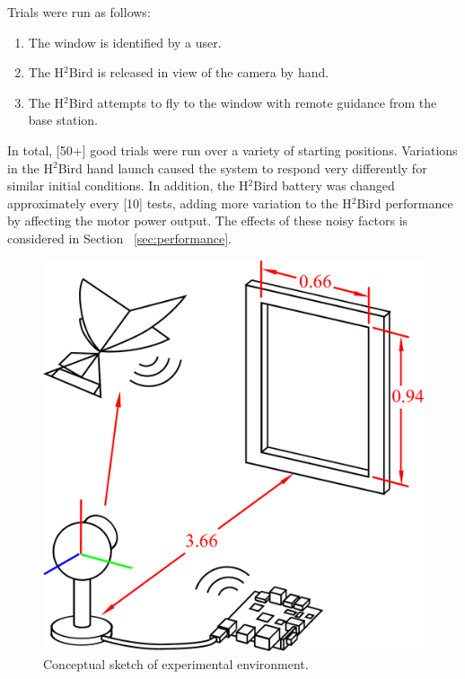 \documentclass{aamas2013}
\begin{document}
Trials were run as follows:
\begin{enumerate}
\item The window is identified by a user. 
\item The H$^2$Bird is released in view of the camera by hand.
\item The H$^2$Bird attempts to fly to the window with remote guidance from
the base station.
\end{enumerate}

In total, [50+] good trials were run over a variety of starting positions. 
Variations in the H$^2$Bird hand launch caused the system to respond very 
differently for similar initial conditions. In addition, the H$^2$Bird 
battery was changed approximately every [10] tests, adding more variation to
the H$^2$Bird performance by affecting the motor power output. The effects of 
these noisy factors is considered in Section ~\ref{sec:performance}.

\begin{figure}[tb]
\centering
\includegraphics[width=\linewidth]{figures/experiment_cartoon.pdf}
\caption{Conceptual sketch of experimental environment.}
\label{fig:experiment_cartoon}
\end{figure}
\end{document}
